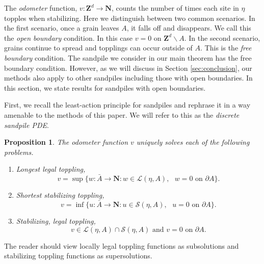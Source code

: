 \documentclass[12pt]{amsart}
\newcommand{\Z}{\mathbf{Z}}
\newcommand{\N}{\mathbf{N}}
\newtheorem{prop}{Proposition}[section]
\begin{document}
The {\it odometer} function, $v: \Z^d \to \N$, counts the number of times each site in $\eta$ topples when stabilizing. Here we distinguish between two common scenarios. 
In the first scenario, once a grain leaves $A$, it falls off and disappears. We call this the {\it open boundary} condition. In this case $v = 0$ on $\Z^d \backslash A$. In the second scenario, 
grains continue to spread and topplings can occur outside of $A$. This is the {\it free boundary} condition. The sandpile we consider in our main theorem has the free 
boundary condition. However, as we will discuss in Section \ref{sec:conclusion}, our methods also apply to other sandpiles including those with open boundaries. In this section, 
we state results for sandpiles with open boundaries. 

First, we recall the least-action principle for sandpiles \cite{fey2010growth} and rephrase it in a way amenable to the methods of this paper. We will refer to this as the {\it discrete sandpile PDE}. 
\begin{prop}\label{prop:least_action}
The odometer function $v$ uniquely solves each of the following problems. 
\begin{enumerate}
\item  Longest legal toppling,
\[
v = \sup\{ w: \bar{A} \to \N : w \in \mathcal{L}(\eta, A), \mbox{ $w = 0$  on $\partial A$}\}.
\]
\item Shortest stabilizing toppling, 
\[
v = \inf\{ u: \bar{A} \to \N : u \in \mathcal{S}(\eta, A),  \mbox{ $u = 0$  on $\partial A$}\}. 
\]
\item Stabilizing, legal toppling, 
\[
 v \in \mathcal{L}(\eta, A) \cap \mathcal{S}(\eta, A) \mbox{ and $v = 0$ on $\partial A$}.
 \]
\end{enumerate}
\end{prop}
The reader should view locally legal toppling functions as subsolutions and stabilizing toppling functions as supersolutions. 
\end{document}
